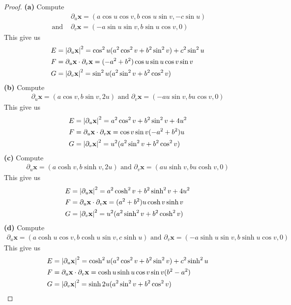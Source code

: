 \documentclass{report}
\begin{document}
\begin{proof}
\textbf{(a)}
Compute 
\begin{align*}
&\partial_u \textbf{x}=(a\cos u \cos v, b \cos u \sin v, -c \sin u)\\
\text{ and }&\partial_v \textbf{x}=(-a \sin u \sin v,b \sin u \cos v, 0)
\end{align*}
This give us 
\begin{align*}
E&=\left|\partial_u\textbf{x}\right|^2= \cos^2 u (a^2\cos ^2v + b^2 \sin^2 v)+c^2 \sin^2 u \\
F&=\partial_u \textbf{x}\cdot \partial_v \textbf{x}=(-a^2+b^2)\cos u \sin u \cos v \sin v\\
G&=\left|\partial_v \textbf{x}\right|^2= \sin^2 u (a^2 \sin^2 v + b^2 \cos ^2 v)
\end{align*}
\textbf{(b)} Compute 
\begin{align*}
\partial_u \textbf{x}=(a\cos v, b \sin v, 2u)\text{ and }\partial_v \textbf{x}=(-au \sin v, b u \cos v, 0)
\end{align*}
This give us 
\begin{align*}
E&=\left|\partial_u \textbf{x}\right|^2= a^2 \cos^2 v + b^2 \sin^2 v + 4u^2\\
F&=\partial_u \textbf{x}\cdot \partial_v \textbf{x}=\cos v \sin v (-a^2 +b^2)u\\
G&=\left|\partial_v \textbf{x}\right|^2 = u^2 (a^2 \sin^2 v+ b^2 \cos ^2 v)
\end{align*}
\textbf{(c)} Compute 
\begin{align*}
  \partial_u \textbf{x}=(a \cosh v, b \sinh v,2u)\text{ and }\partial_v \textbf{x}=(au \sinh v, b u \cosh v, 0)
\end{align*}
This give us 
\begin{align*}
E&=\left|\partial_u \textbf{x}\right|^2 = a^2 \cosh^2 v+ b^2 \sinh^2 v+4u^2\\
F&=\partial_u \textbf{x}\cdot \partial_v \textbf{x}=(a^2+b^2)u \cosh v \sinh v\\
G&=\left|\partial_v \textbf{x}\right|^2= u^2 (a^2 \sinh^2 v+ b^2 \cosh^2 v)
\end{align*}
\textbf{(d)} Compute 
\begin{align*}
\partial_u \textbf{x}=(a \cosh u \cos v , b \cosh u \sin v, c\sinh u)\text{ and }\partial_v \textbf{x}=(-a\sinh u \sin v, b \sinh u \cos v, 0)
\end{align*}
This give us 
\begin{align*}
E&= \left|\partial _u\textbf{x}\right|^2= \cosh^2 u (a^2 \cos^2 v+b^2 \sin^2 v)+c^2 \sinh^2 u\\
F&=\partial_u \textbf{x}\cdot \partial_v \textbf{x}= \cosh u \sinh u \cos v \sin v (b^2-a^2)\\
G&=\left|\partial_v \textbf{x}\right|^2 = \sinh2 u (a^2 \sin^2 v +b^2 \cos^2 v)
\end{align*}
\end{proof}
\end{document}
